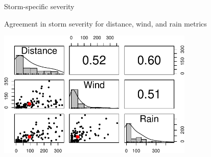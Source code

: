 \documentclass[ignorenonframetext,]{beamer}
\begin{document}
\begin{frame}{Storm-specific severity}

\begin{center}
\large Agreement in storm severity for distance, wind, and rain metrics
\end{center}

\begin{center}\includegraphics[width=0.7\textwidth]{anderson_jan18_files/figure-beamer/unnamed-chunk-15-1} \end{center}

\end{frame}
\end{document}

